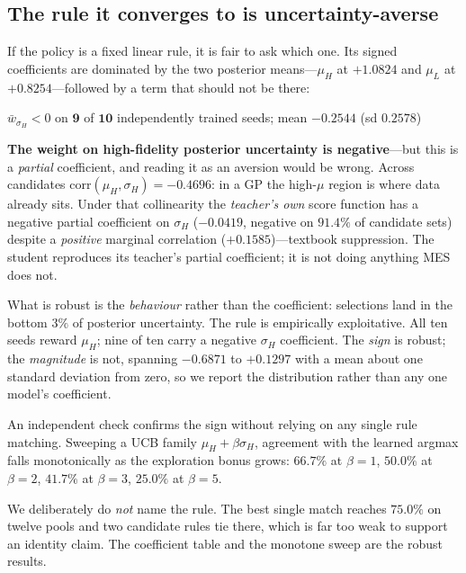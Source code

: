 \documentclass[11pt]{article}
\begin{document}
\subsection{The rule it converges to is uncertainty-averse}
\label{sec:rule}

If the policy is a fixed linear rule, it is fair to ask which one. Its signed
coefficients are dominated by the two posterior means---$\mu_H$ at $+1.0824$ and
$\mu_L$ at $+0.8254$---followed by a term that should not be there:

\begin{center}
$\bar{w}_{\sigma_H} < 0$ on $\mathbf{9}$ of $\mathbf{10}$ independently trained
seeds; mean $\mathbf{-0.2544}$ (sd $0.2578$)
\end{center}

\noindent
\textbf{The weight on high-fidelity posterior uncertainty is negative}---but this
is a \emph{partial} coefficient, and reading it as an aversion would be wrong.
Across candidates $\mathrm{corr}(\mu_H,\sigma_H) = -0.4696$: in a GP the
high-$\mu$ region is where data already sits. Under that collinearity the
\emph{teacher's own} score function has a negative partial coefficient on
$\sigma_H$ ($-0.0419$, negative on $91.4\%$ of candidate sets) despite a
\emph{positive} marginal correlation ($+0.1585$)---textbook suppression. The
student reproduces its teacher's partial coefficient; it is not doing anything
MES does not.

What is robust is the \emph{behaviour} rather than the coefficient: selections
land in the bottom $3\%$ of posterior uncertainty. The rule is empirically
exploitative. All ten seeds reward $\mu_H$; nine of ten carry a negative
$\sigma_H$ coefficient. The \emph{sign} is robust; the \emph{magnitude} is not,
spanning $-0.6871$ to $+0.1297$ with a mean about one standard deviation from
zero, so we report the distribution rather than any one model's coefficient.

An independent check confirms the sign without relying on any single rule
matching. Sweeping a UCB family $\mu_H + \beta\sigma_H$, agreement with the
learned argmax falls monotonically as the exploration bonus grows:
$66.7\%$ at $\beta{=}1$, $50.0\%$ at $\beta{=}2$, $41.7\%$ at $\beta{=}3$,
$25.0\%$ at $\beta{=}5$.

We deliberately do \emph{not} name the rule. The best single match reaches
$75.0\%$ on twelve pools and two candidate rules tie there, which is far too
weak to support an identity claim. The coefficient table and the monotone sweep
are the robust results.
\end{document}

